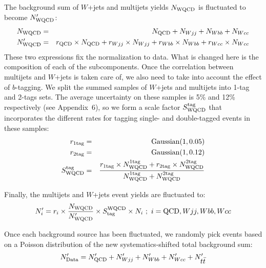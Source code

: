 The background sum of $W$+jets and multijets yields $N_{\rm WQCD}$ is
fluctuated to become $N_{\rm WQCD}^{\prime}$:
\begin{eqnarray*}
N_{\rm WQCD}          &=& N_{\rm QCD} + N_{Wjj} + N_{Wbb} + N_{Wcc} \\
N_{\rm WQCD}^{\prime} &=& r_{\rm QCD}\times N_{\rm QCD}
                        + r_{Wjj}    \times N_{Wjj}
                        + r_{Wbb}    \times N_{Wbb}
                        + r_{Wcc}    \times N_{Wcc}
\end{eqnarray*}
These two expressions fix the normalization to data. What is changed
here is the composition of each of the subcomponents. Once the
correlation between multijets and $W$+jets is taken care of, we also
need to take into account the effect of $b$-tagging. We split the
summed samples of $W$+jets and multijets into 1-tag and 2-tags
sets. The average uncertainty on these samples is 5\% and 12\%
respectively (see Appendix~6), so we form a scale factor $S^{\rm
tag}_{\rm WQCD}$ that incorporates the different rates for tagging
single- and double-tagged events in these samples:
\begin{eqnarray*}
r_{\rm 1tag} &=& {\rm Gaussian}(1,0.05) \\
r_{\rm 2tag} &=& {\rm Gaussian}(1,0.12) \\
S^{\rm tag}_{\rm WQCD}
             &=& \frac{r_{\rm 1tag} \times N^{\rm 1tag}_{\rm WQCD}
                    +  r_{\rm 2tag} \times N^{\rm 2tag}_{\rm WQCD}}
                {N^{\rm 1tag}_{\rm WQCD} + N^{\rm 2tag}_{\rm WQCD}}
\end{eqnarray*}

Finally, the multijets and $W$+jets event yields are fluctuated to:
$$
N_{i}^{\prime} = r_{i} \times \frac{N_{\rm WQCD}}
                                   {N_{\rm WQCD}^{\prime}}
                       \times S_{\rm tag}^{\rm WQCD}
                       \times N_{i} ~;~ i = {\rm QCD}, Wjj, Wbb, Wcc
$$

Once each background source has been fluctuated, we randomly pick
events based on a Poisson distribution of the new systematics-shifted
total background sum:
$$
N_{\rm Data}^{\prime} = N_{\rm QCD}^{\prime}
                      + N_{Wjj}^{\prime}
                      + N_{Wbb}^{\prime}
                      + N_{Wcc}^{\prime}
                      + N_{\mbox{$t\bar{t}$}}^{\prime}
$$

